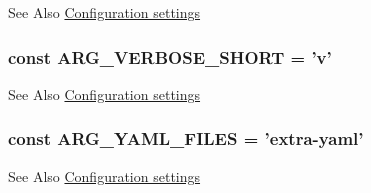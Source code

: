 \begin{DoxySeeAlso}{See Also}
\hyperlink{group__config}{Configuration settings} 
\end{DoxySeeAlso}
\hypertarget{group__args_gab83df86552c8e9e5c2382a8948111235}{
\subsubsection[{A\-R\-G\-\_\-\-V\-E\-R\-B\-O\-S\-E\-\_\-\-S\-H\-O\-R\-T}]{\setlength{\rightskip}{0pt plus 5cm}const A\-R\-G\-\_\-\-V\-E\-R\-B\-O\-S\-E\-\_\-\-S\-H\-O\-R\-T = 'v'}}\label{group__args_gab83df86552c8e9e5c2382a8948111235}
\begin{DoxySeeAlso}{See Also}
\hyperlink{group__config}{Configuration settings} 
\end{DoxySeeAlso}
\hypertarget{group__args_ga17328c6a748e7ced71ea6ed9b0107742}{
\subsubsection[{A\-R\-G\-\_\-\-Y\-A\-M\-L\-\_\-\-F\-I\-L\-E\-S}]{\setlength{\rightskip}{0pt plus 5cm}const A\-R\-G\-\_\-\-Y\-A\-M\-L\-\_\-\-F\-I\-L\-E\-S = 'extra-\/yaml'}}\label{group__args_ga17328c6a748e7ced71ea6ed9b0107742}
\begin{DoxySeeAlso}{See Also}
\hyperlink{group__config}{Configuration settings} 
\end{DoxySeeAlso}
